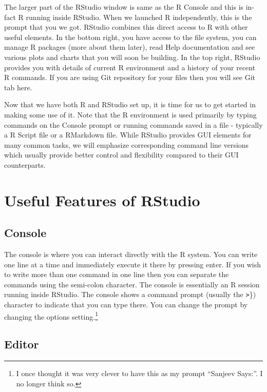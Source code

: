 \documentclass[]{krantz}
\theoremstyle{definition}
\theoremstyle{definition}
\theoremstyle{definition}
\theoremstyle{remark}
\begin{document}
The larger part of the RStudio window is same as the R Console and this
is in-fact R running inside RStudio. When we launched R independently,
this is the prompt that you we got. RStudio combines this direct access
to R with other useful elements. In the bottom right, you have access to
the file system, you can manage R packages (more about them later), read
Help documentation and see various plots and charts that you will soon
be building. In the top right, RStudio provides you with details of
current R environment and a history of your recent R commands. If you
are using Git repository for your files then you will see Git tab here.

Now that we have both R and RStudio set up, it is time for us to get
started in making some use of it. Note that the R environment is used
primarily by typing commands on the Console prompt or running commands
saved in a file - typically a R Script file or a RMarkdown file. While
RStudio provides GUI elements for many common tasks, we will emphasize
corresponding command line versions which usually provide better control
and flexibility compared to their GUI counterparts.

\section{Useful Features of RStudio}\label{useful-features-of-rstudio}

\subsection{Console}\label{console}

The console is where you can interact directly with the R system. You
can write one line at a time and immediately execute it there by
pressing enter. If you wish to write more than one command in one line
then you can separate the commands using the semi-colon character. The
console is essentially an R session running inside RStudio. The console
shows a command prompt (usually the \texttt{\textgreater{}}\}) character
to indicate that you can type there. You can change the prompt by
changing the options setting.\footnote{I once thought it was very clever
  to have this as my prompt ``Sanjeev Says:''. I no longer think so.}

\subsection{Editor}\label{editor}
\end{document}
